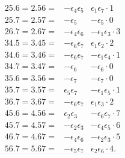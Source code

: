 \documentclass[11pt,a4paper]{article}
\begin{document}
\[\begin{array}{lll}
    25.6 = 2.56 = & -\epsilon_{4}\epsilon_{5} & \epsilon_{1}\epsilon_{7}\cdot 1\\
    25.7 = 2.57 = & -\epsilon_{5} & -\epsilon_{5} \cdot 0\\
    26.7 = 2.67 = & -\epsilon_{4}\epsilon_{6} & -\epsilon_{1}\epsilon_{3}\cdot 3\\
    34.5 = 3.45 = & -\epsilon_{6}\epsilon_{7} & \epsilon_{1}\epsilon_{2}\cdot 2\\
    34.6 = 3.46 = & -\epsilon_{6}\epsilon_{7} & -\epsilon_{1}\epsilon_{4}\cdot 1\\
    34.7 = 3.47 = & -\epsilon_{6} & -\epsilon_{6} \cdot 0\\
    35.6 = 3.56 = & -\epsilon_{7} & -\epsilon_{7} \cdot 0\\
    35.7 = 3.57 = & \epsilon_{5}\epsilon_{7} & -\epsilon_{1}\epsilon_{5}\cdot 1\\
    36.7 = 3.67 = & -\epsilon_{6}\epsilon_{7} & \epsilon_{1}\epsilon_{3}\cdot 2\\
    45.6 = 4.56 = & \epsilon_{2}\epsilon_{3} & -\epsilon_{6}\epsilon_{7}\cdot 7\\
    45.7 = 4.57 = & -\epsilon_{2}\epsilon_{3} & -\epsilon_{4}\epsilon_{5}\cdot 6\\
    46.7 = 4.67 = & -\epsilon_{4}\epsilon_{6} & -\epsilon_{2}\epsilon_{3}\cdot 5\\
    56.7 = 5.67 = & -\epsilon_{5}\epsilon_{7} & \epsilon_{2}\epsilon_{6}\cdot 4.
  \end{array}
\]
\end{document}
